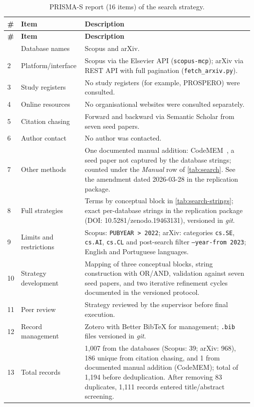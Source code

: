 \begin{longtable}{p{0.5cm}p{4cm}p{9cm}}
\caption{PRISMA-S report (16 items) of the search strategy.}
\label{tab:prisma-s} \\
\toprule
\textbf{\#} & \textbf{Item} & \textbf{Description} \\
\midrule
\endfirsthead
\toprule
\textbf{\#} & \textbf{Item} & \textbf{Description} \\
\midrule
\endhead
\bottomrule
\endfoot
1 & Database names & Scopus and arXiv. \\
2 & Platform/interface & Scopus via the Elsevier API (\texttt{scopus-mcp}); arXiv via REST API with full pagination (\texttt{fetch\_arxiv.py}). \\
3 & Study registers & No study registers (for example, PROSPERO) were consulted. \\
4 & Online resources & No organisational websites were consulted separately. \\
5 & Citation chasing & Forward and backward via Semantic Scholar from seven seed papers. \\
6 & Author contact & No author was contacted. \\
7 & Other methods & One documented manual addition: CodeMEM~\citep{wang2026codemem}, a seed paper not captured by the database strings; counted under the \textit{Manual} row of \autoref{tab:search}. See the amendment dated 2026-03-28 in the replication package. \\
8 & Full strategies & Terms by conceptual block in \autoref{tab:search-strings}; exact per-database strings in the replication package (DOI: 10.5281/zenodo.19463131), versioned in \textit{git}. \\
9 & Limits and restrictions & Scopus: \texttt{PUBYEAR > 2022}; arXiv: categories \texttt{cs.SE}, \texttt{cs.AI}, \texttt{cs.CL} and post-search filter \texttt{--year-from 2023}; English and Portuguese languages. \\
10 & Strategy development & Mapping of three conceptual blocks, string construction with OR/AND, validation against seven seed papers, and two iterative refinement cycles documented in the versioned protocol. \\
11 & Peer review & Strategy reviewed by the supervisor before final execution. \\
12 & Record management & Zotero with Better BibTeX for management; \texttt{.bib} files versioned in \textit{git}. \\
13 & Total records & 1,007 from the databases (Scopus: 39; arXiv: 968), 186 unique from citation chasing, and 1 from documented manual addition (CodeMEM); total of 1,194 before deduplication. After removing 83 duplicates, 1,111 records entered title/abstract screening. \\

\end{longtable}
